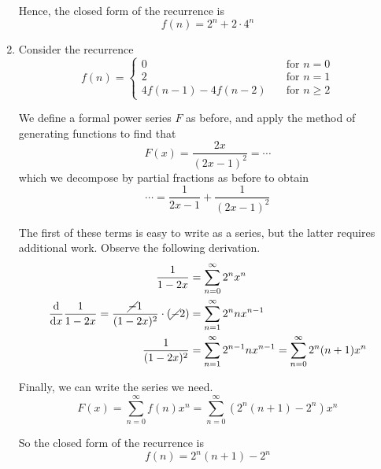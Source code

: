 \documentclass[11pt]{article}
\begin{document}
\begin{enumerate}
        Hence, the closed form of the recurrence is
        \begin{equation*}
            f(n) = 2^n + 2 \cdot 4^n
        \end{equation*}

    \item
        Consider the recurrence
        \begin{equation*}
            f(n) = \begin{cases}
                0   &\quad\text{for } n = 0 \\
                2   &\quad\text{for } n = 1 \\
                4 f(n-1) - 4 f(n-2)
                    &\quad\text{for } n \geq 2
            \end{cases}
        \end{equation*}

        We define a formal power series $F$ as before, and apply the method of
        generating functions to find that
        \begin{equation*}
            F(x) = \frac{2x}{(2x - 1)^2} = \cdots
        \end{equation*}
        which we decompose by partial fractions as before to obtain
        \begin{equation*}
            \cdots = \frac{1}{2x - 1} + \frac{1}{(2x-1)^2}
        \end{equation*}

        The first of these terms is easy to write as a series, but the latter
        requires additional work. Observe the following derivation.
        \begin{align*}
            \frac{1}{1-2x} &= \sum_{n=0}^\infty 2^n x^n \\
            \frac{\mathrm{d} }{\mathrm{d} x} \frac{1}{1-2x}
                = \frac{\cancel{-}1}{(1-2x)^2} \cdot (\cancel{-} 2)
                &= \sum_{n=1}^\infty 2^n n x^{n-1} \\
            \frac{1}{(1-2x)^2} &=
                \sum_{n=1}^\infty 2^{n-1} n x^{n-1}
                =
                \sum_{n=0}^\infty 2^n (n+1) x^n
        \end{align*}

        Finally, we can write the series we need.
        \begin{equation*}
            F(x)
            = \sum_{n=0}^\infty f(n) x^n
            = \sum_{n=0}^\infty (2^n (n+1) - 2^n) x^n
        \end{equation*}

        So the closed form of the recurrence is
        \begin{equation*}
            f(n) = 2^n (n+1) - 2^n
        \end{equation*}
\end{enumerate}
\end{document}
